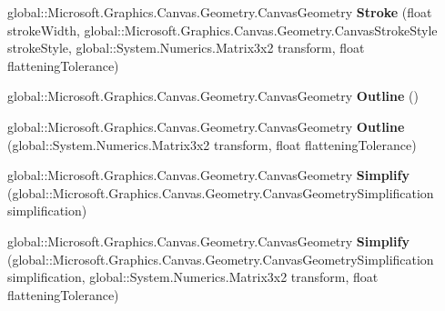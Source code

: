 \begin{DoxyCompactItemize}
\item 
\mbox{\label{class_microsoft_1_1_graphics_1_1_canvas_1_1_geometry_1_1_canvas_geometry_acd5ab184e01cc9bd574ccbe0932c0dfd}} 
global\+::\+Microsoft.\+Graphics.\+Canvas.\+Geometry.\+Canvas\+Geometry {\bfseries Stroke} (float stroke\+Width, global\+::\+Microsoft.\+Graphics.\+Canvas.\+Geometry.\+Canvas\+Stroke\+Style stroke\+Style, global\+::\+System.\+Numerics.\+Matrix3x2 transform, float flattening\+Tolerance)
\item 
\mbox{\label{class_microsoft_1_1_graphics_1_1_canvas_1_1_geometry_1_1_canvas_geometry_a2a21e622cb17f94954463d620c8ba650}} 
global\+::\+Microsoft.\+Graphics.\+Canvas.\+Geometry.\+Canvas\+Geometry {\bfseries Outline} ()
\item 
\mbox{\label{class_microsoft_1_1_graphics_1_1_canvas_1_1_geometry_1_1_canvas_geometry_adcb0f78086d81ae4f562717eb38c2207}} 
global\+::\+Microsoft.\+Graphics.\+Canvas.\+Geometry.\+Canvas\+Geometry {\bfseries Outline} (global\+::\+System.\+Numerics.\+Matrix3x2 transform, float flattening\+Tolerance)
\item 
\mbox{\label{class_microsoft_1_1_graphics_1_1_canvas_1_1_geometry_1_1_canvas_geometry_a6b1ed02a2f08b0b00376d6eaca06738f}} 
global\+::\+Microsoft.\+Graphics.\+Canvas.\+Geometry.\+Canvas\+Geometry {\bfseries Simplify} (global\+::\+Microsoft.\+Graphics.\+Canvas.\+Geometry.\+Canvas\+Geometry\+Simplification simplification)
\item 
\mbox{\label{class_microsoft_1_1_graphics_1_1_canvas_1_1_geometry_1_1_canvas_geometry_a75548d17512c7e4839b879a019ea52f2}} 
global\+::\+Microsoft.\+Graphics.\+Canvas.\+Geometry.\+Canvas\+Geometry {\bfseries Simplify} (global\+::\+Microsoft.\+Graphics.\+Canvas.\+Geometry.\+Canvas\+Geometry\+Simplification simplification, global\+::\+System.\+Numerics.\+Matrix3x2 transform, float flattening\+Tolerance)
\item 
\mbox{\label{class_microsoft_1_1_graphics_1_1_canvas_1_1_geometry_1_1_canvas_geometry_a294f720439af95f7c721bc3c6c501e66}} 

\end{DoxyCompactItemize}
